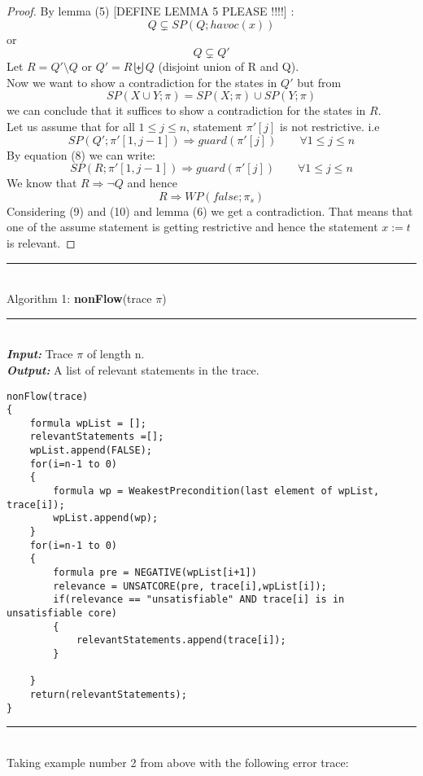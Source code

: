 \documentclass{article}
\newcommand{\limp}{\Rightarrow}
\begin{document}
\begin{proof}
By lemma (5) [DEFINE LEMMA 5 PLEASE !!!!] :
$$Q \subsetneq SP(Q; havoc(x))$$
or
$$Q \subsetneq Q'$$
Let $R = Q'\setminus Q$ or $Q'=R \biguplus Q$ (disjoint union of R and Q).\\
Now we want to show a contradiction for the states in $Q'$ but from 
\begin{equation} 
SP(X \cup Y; \pi) = SP(X; \pi) \cup SP(Y;\pi)
\end{equation}
we can conclude that it suffices to show a contradiction for the states in $R$.\\
Let us assume that for all $1 \leq j \leq n$, statement $\pi'[j]$ is not restrictive. i.e
$$SP(Q';\pi'[1,j-1]) \limp guard(\pi'[j]) \qquad \forall 1 \leq j \leq n$$
By equation (8) we can write:
\begin{equation} 
SP(R; \pi'[1, j-1]) \limp guard(\pi'[j]) \qquad \forall 1 \leq j \leq n
\end{equation}
We know that $R \limp \neg Q$ and hence
\begin{equation} 
R \limp WP(false; \pi_s)
\end{equation}
Considering (9) and (10) and lemma (6) we get a contradiction.
That means that one of the assume statement is getting restrictive and hence the statement $x:=t$ is relevant.
\end{proof}

\newpage
\rule{\textwidth}{1pt}\\
Algorithm 1: \textbf{nonFlow}(trace $\pi$)\\
\noindent\rule{12cm}{0.4pt}\\
\textbf{\textit{Input:}} Trace $\pi$ of length n.\\
\textbf{\textit{Output:}} A list of relevant statements in the trace.
\begin{lstlisting}
nonFlow(trace)
{
	formula wpList = [];
	relevantStatements =[];
	wpList.append(FALSE);
	for(i=n-1 to 0)
	{
		formula wp = WeakestPrecondition(last element of wpList, trace[i]);
		wpList.append(wp);
	}
	for(i=n-1 to 0)
	{
		formula pre = NEGATIVE(wpList[i+1])
		relevance = UNSATCORE(pre, trace[i],wpList[i]);
		if(relevance == "unsatisfiable" AND trace[i] is in unsatisfiable core)
		{
			relevantStatements.append(trace[i]);
		}
		
	}
	return(relevantStatements);
}
\end{lstlisting}
\rule{\textwidth}{1pt}\\
Taking example number 2 from above with the following error trace:
\end{document}
